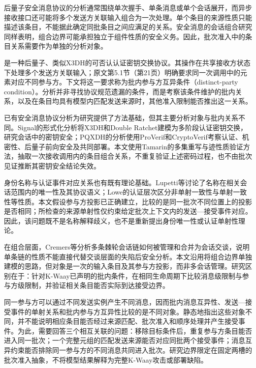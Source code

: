 后量子安全消息协议的分析通常围绕单次握手、单条消息或单个会话展开，而异步接收接口还可能将多个发送方关联输入组合为一次处理。单个条目的来源性质只能描述该条目，不能据此确定同批条目之间应满足的关系。安全消息的会话组合研究同样表明，组合边界可能承担独立于组件性质的安全义务\cite{cremers2023session}。因此，批次准入中的条目关系需要作为单独的分析对象。

\kwaay 是一种后量子、类似X3DH的可否认认证密钥交换协议\cite{collins2024kwaay}。其\batchreceive 操作在共享接收方状态下处理多个发送方关联输入；原文第5.1节（第21页）明确要求同一次调用中的元素对应不同参与方\cite{collins2024kwaayfull}。下文将这一要求称为批内参与方互异条件（distinct-party condition）。分析并非寻找协议规范遗漏的条件，而是考察该条件维护的批内关系，以及在条目均具有模型内匹配发送来源时，其他准入限制能否推出这一关系。

已有安全消息协议分析为研究提供了方法基础，但其主要分析对象与批内关系不同。Signal的形式化分析将X3DH和Double Ratchet建模为多阶段认证密钥交换，研究会话中的密钥安全；PQXDH的分析使用ProVerif和CryptoVerif考察认证、机密性、后量子前向安全及共同部署\cite{cohngordon2020signal,bhargavan2024pqxdh}。本文使用Tamarin的多集重写与迹性质验证方法\cite{meier2013tamarin}，抽取一次接收调用内的条目组合关系，不重复验证上述密码过程，也不由批次见证推断其密钥安全结论失效。

身份名称与认证事件对应关系也有既有理论基础。Lupetti等讨论了名称在相关会话范围内的唯一性及其协议语义\cite{lupetti2006names}；Lowe的认证层次区分非单射一致性与单射一致性等性质\cite{lowe1997hierarchy}。本文假设参与方投影已正确建立，比较的是同一批次不同位置上的投影是否相同；所检查的来源单射性仅约束给定批次上下文内的发送—接受事件对应。因此，该问题既不是名称解释歧义，也不是重新提出身份唯一性或认证单射性理论。

在组合层面，Cremers等分析多条棘轮会话链如何被管理和合并为会话交谈，说明单条链的性质不能直接代替交谈层面的失陷后安全分析\cite{cremers2023session}。本文沿用将组合边界单独建模的思路，但对象是一次\batchreceive 的输入条目及其参与方投影，而非多会话管理。研究区别在于：针对K-Waay已声明的批内条件，在相同生命周期下比较消息级限制与参与方级限制，并验证相关条目能否实际到达接受边界。

同一参与方可以通过不同发送实例产生不同消息，因而批内消息互异性、发送—接受事件的单射关系和批内参与方互异性比较的是不同对象。静态地指出这些对象不同，并不能说明相应条目能否经过来源匹配、批次准入和顺序处理并产生接受事件。为此，需要回答三个相互关联的问题：移除目标条件后，重复参与方条目能否进入同一批次；一个完整元组的匹配发送来源能否对应同批两个接受事件；消息互异约束能否排除同一参与方的不同消息共同进入批次。研究边界限定在固定两槽的批次准入抽象，不将模型结果解释为完整K-Waay攻击或部署缺陷。

